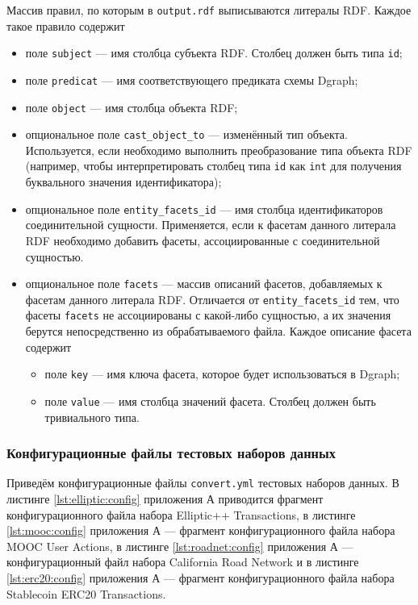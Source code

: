 Массив правил, по которым в \texttt{output.rdf} выписываются литералы RDF. Каждое такое правило содержит
\begin{itemize}
  \item поле \texttt{subject} --- имя столбца субъекта RDF. Столбец должен быть типа \texttt{id};
  \item поле \texttt{predicat} --- имя соответствующего предиката схемы Dgraph;
  \item поле \texttt{object} --- имя столбца объекта RDF;
  \item опциональное поле \texttt{cast\_object\_to} --- изменённый тип объекта. Используется, если необходимо
    выполнить преобразование типа объекта RDF (например, чтобы интерпретировать столбец типа \texttt{id} как
    \texttt{int} для получения буквального значения идентификатора);
  \item опциональное поле \texttt{entity\_facets\_id} --- имя столбца идентификаторов соединительной сущности.
    Применяется, если к фасетам данного литерала RDF необходимо добавить фасеты, ассоциированные с соединительной
    сущностью.
  \item опциональное поле \texttt{facets} --- массив описаний фасетов, добавляемых к фасетам данного литерала RDF.
    Отличается от \texttt{entity\_facets\_id} тем, что фасеты \texttt{facets} не ассоциированы с какой-либо сущностью, а
    их значения берутся непосредственно из обрабатываемого файла. Каждое описание фасета содержит
    \begin{itemize}
      \item поле \texttt{key} --- имя ключа фасета, которое будет использоваться в Dgraph;
      \item поле \texttt{value} --- имя столбца значений фасета. Столбец должен быть тривиального типа.
    \end{itemize}
\end{itemize}

\subsubsection{Конфигурационные файлы тестовых наборов данных}

Приведём конфигурационные файлы \texttt{convert.yml} тестовых наборов данных. В листинге \ref{lst:elliptic:config}
приложения А приводится фрагмент конфигурационного файла набора Elliptic++ Transactions, в листинге
\ref{lst:mooc:config} приложения А --- фрагмент конфигурационного файла набора MOOC User Actions, в листинге
\ref{lst:roadnet:config} приложения А --- конфигурационный файл набора California Road Network и в листинге
\ref{lst:erc20:config} приложения А --- фрагмент конфигурационного файла набора Stablecoin ERC20 Transactions.


